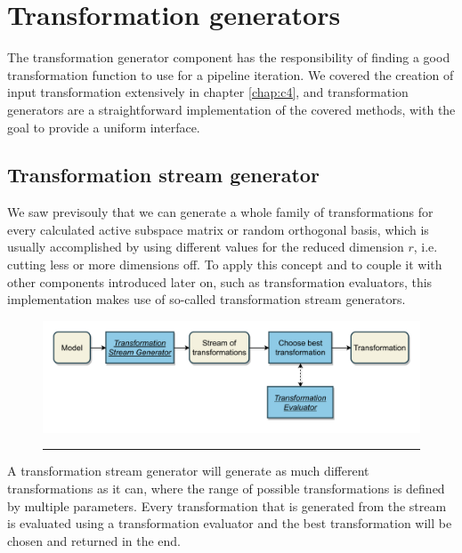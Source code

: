 \documentclass[
  a4paper,  %
  twoside,  %
  bibliography=totoc,
  headsepline,
  cleardoublepage=empty,
  parskip=half,
  draft=false
]{scrbook}
\newcommand{\delimit}{{\color{silver}\noindent\rule{\textwidth}{1pt}}}
\begin{document}
\newpage
\section {Transformation generators}
\label{sec:tg}

The transformation generator component has the responsibility of finding a good transformation function to use for a pipeline iteration.
We covered the creation of input transformation extensively in chapter \cref{chap:c4}, and transformation generators are a straightforward implementation of the covered methods, with the goal to provide a uniform interface.

\subsection {Transformation stream generator}

We saw previsouly that we can generate a whole family of transformations for every calculated active subspace matrix or random orthogonal basis, which is usually accomplished by using different values for the reduced dimension $r$, i.e. cutting less or more dimensions off.
To apply this concept and to couple it with other components introduced later on, such as transformation evaluators, this implementation makes use of so-called transformation stream generators.

\begin{mdframed}[style=style,frametitle={Transformation generator (stream-based)}]
\begin{figure}[H]
\includegraphics[width=\textwidth]{graphics/TransformationGen_Stream.pdf}
\delimit

\end{figure}
\end{mdframed}

A transformation stream generator will generate as much different transformations as it can, where the range of possible transformations is defined by multiple parameters.
Every transformation that is generated from the stream is evaluated using a transformation evaluator and the best transformation will be chosen and returned in the end.
\end{document}
